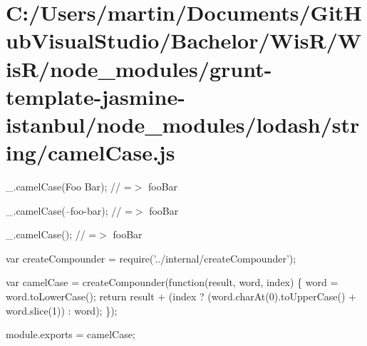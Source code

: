\hypertarget{_c_1_2_users_2martin_2_documents_2_git_hub_visual_studio_2_bachelor_2_wis_r_2_wis_r_2node_modulea6de7e6e1b786047b26b88f4ded6ec54}{}\section{C\+:/\+Users/martin/\+Documents/\+Git\+Hub\+Visual\+Studio/\+Bachelor/\+Wis\+R/\+Wis\+R/node\+\_\+modules/grunt-\/template-\/jasmine-\/istanbul/node\+\_\+modules/lodash/string/camel\+Case.\+js}
\+\_\+.\+camel\+Case(\textquotesingle{}Foo Bar\textquotesingle{}); // =$>$ \textquotesingle{}foo\+Bar\textquotesingle{}

\+\_\+.\+camel\+Case(\textquotesingle{}--foo-\/bar\textquotesingle{}); // =$>$ \textquotesingle{}foo\+Bar\textquotesingle{}

\+\_\+.\+camel\+Case(\textquotesingle{}); // =$>$ \textquotesingle{}foo\+Bar\textquotesingle{}


\begin{DoxyCodeInclude}
var createCompounder = require(\textcolor{stringliteral}{'../internal/createCompounder'});

var camelCase = createCompounder(\textcolor{keyword}{function}(result, word, index) \{
  word = word.toLowerCase();
  \textcolor{keywordflow}{return} result + (index ? (word.charAt(0).toUpperCase() + word.slice(1)) : word);
\});

module.exports = camelCase;
\end{DoxyCodeInclude}
 